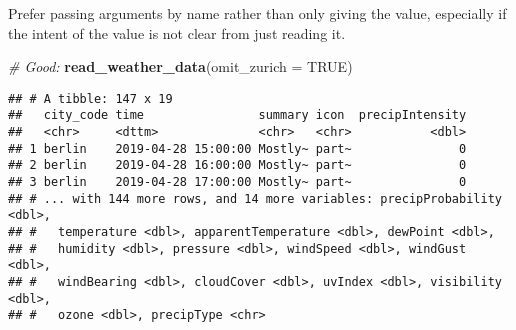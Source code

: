 \documentclass[]{book}
\newenvironment{Shaded}{\begin{snugshade}}{\end{snugshade}}
\newcommand{\CommentTok}[1]{\textcolor[rgb]{0.56,0.35,0.01}{\textit{#1}}}
\newcommand{\ControlFlowTok}[1]{\textcolor[rgb]{0.13,0.29,0.53}{\textbf{#1}}}
\newcommand{\DataTypeTok}[1]{\textcolor[rgb]{0.13,0.29,0.53}{#1}}
\newcommand{\KeywordTok}[1]{\textcolor[rgb]{0.13,0.29,0.53}{\textbf{#1}}}
\newcommand{\NormalTok}[1]{#1}
\newcommand{\OperatorTok}[1]{\textcolor[rgb]{0.81,0.36,0.00}{\textbf{#1}}}
\newcommand{\OtherTok}[1]{\textcolor[rgb]{0.56,0.35,0.01}{#1}}
\newcommand{\StringTok}[1]{\textcolor[rgb]{0.31,0.60,0.02}{#1}}
\begin{document}
\begin{Shaded}
\end{Shaded}

Prefer passing arguments by name rather than only giving the value, especially if the intent of the value is not clear from just reading it.

\begin{Shaded}
\begin{Highlighting}[]
\CommentTok{# Good:}
\KeywordTok{read_weather_data}\NormalTok{(}\DataTypeTok{omit_zurich =} \OtherTok{TRUE}\NormalTok{)}
\end{Highlighting}
\end{Shaded}

\begin{verbatim}
## # A tibble: 147 x 19
##   city_code time                summary icon  precipIntensity
##   <chr>     <dttm>              <chr>   <chr>           <dbl>
## 1 berlin    2019-04-28 15:00:00 Mostly~ part~               0
## 2 berlin    2019-04-28 16:00:00 Mostly~ part~               0
## 3 berlin    2019-04-28 17:00:00 Mostly~ part~               0
## # ... with 144 more rows, and 14 more variables: precipProbability <dbl>,
## #   temperature <dbl>, apparentTemperature <dbl>, dewPoint <dbl>,
## #   humidity <dbl>, pressure <dbl>, windSpeed <dbl>, windGust <dbl>,
## #   windBearing <dbl>, cloudCover <dbl>, uvIndex <dbl>, visibility <dbl>,
## #   ozone <dbl>, precipType <chr>
\end{verbatim}
\end{document}
